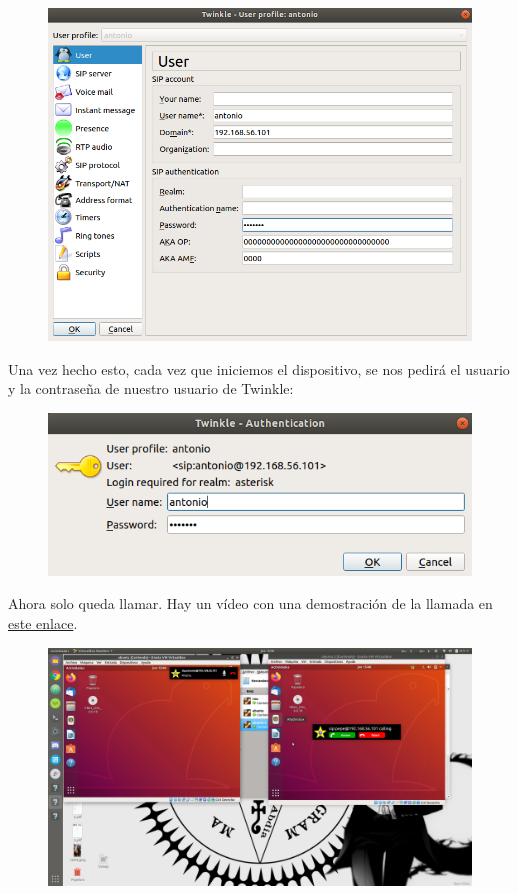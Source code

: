 \documentclass[11pt,a4paper]{article}
\begin{document}
\begin{figure}[H]
	\centering
	\includegraphics[scale=0.5]{img/10.png}
\end{figure}

Una vez hecho esto, cada vez que iniciemos el dispositivo, se nos pedirá el usuario y la contraseña de nuestro usuario de Twinkle:

\begin{figure}[H]
	\centering
	\includegraphics[scale=0.5]{img/12.png}
\end{figure}

Ahora solo queda llamar. Hay un vídeo con una demostración de la llamada en \color{blue}\href{https://drive.google.com/open?id=1scSfceEorV1KhGiVuoRm8_sYQUkKtd5i}{este enlace}. \color{black}

\begin{figure}[H]
	\centering
	\includegraphics[scale=0.2]{img/13.png}
\end{figure}
\end{document}
